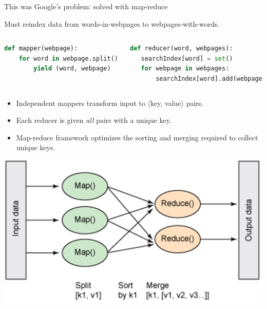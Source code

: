\documentclass{beamer}
\begin{document}
\begin{frame}[fragile]{This was Google's problem: solved with map-reduce}

Must reindex data from words-in-webpages to \mbox{webpages-with-words.\hspace{-1 cm}}

\begin{columns}
\begin{lstlisting}[language=python,frame=single]
def mapper(webpage):
    for word in webpage.split():
        yield (word, webpage)
    
\end{lstlisting}
\begin{lstlisting}[language=python,frame=single]
def reducer(word, webpages):
   searchIndex[word] = set()
   for webpage in webpages:
       searchIndex[word].add(webpage)
\end{lstlisting}
\end{columns}

\begin{itemize}
\item Independent mappers transform input to $\langle$key, value$\rangle$ pairs.
\item Each reducer is given {\it all} pairs with a unique key.
\item Map-reduce framework optimizes the sorting and merging required to collect unique keys.
\end{itemize}

\begin{center}
\includegraphics[width=0.65\linewidth]{mapreduce-diagram-by-ibm.png}
\end{center}
\end{frame}
\end{document}
